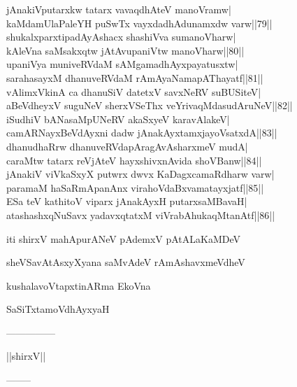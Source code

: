 \documentclass{article}
\begin{document}
jAnakiVputarxkw tatarx vavaqdhAteV manoVramw|\\
kaMdamUlaPaleYH puSwTx vayxdadhAdunamxdw varw||79||\\
shukalxparxtipadAyAshacx shashiVva sumanoVharw|\\
kAleVna saMsakxqtw jAtAvupaniVtw manoVharw||80||\\
upaniVya muniveRVdaM sAMgamadhAyxpayatusxtw|\\
sarahasayxM dhanuveRVdaM rAmAyaNamapAThayatf||81||\\
vAlimxVkinA ca dhanuSiV datetxV savxNeRV suBUSiteV|\\
aBeVdheyxV suguNeV sherxVSeThx veYrivaqMdasudAruNeV||82||\\
iSudhiV bANasaMpUNeRV akaSxyeV karavAlakeV|\\
camARNayxBeVdAyxni dadw jAnakAyxtamxjayoVsatxdA||83||\\
dhanudhaRrw dhanuveRVdapAragAvAsharxmeV mudA|\\
caraMtw tatarx reVjAteV hayxshivxnAvida shoVBanw||84||\\
jAnakiV viVkaSxyX putwrx dwvx KaDagxcamaRdharw varw|\\
paramaM haSaRmApanAnx virahoVdaBxvamatayxjatf||85||\\
ESa teV kathitoV viparx jAnakAyxH putarxsaMBavaH|\\
atashashxqNuSavx yadavxqtatxM viVrabAhukaqMtanAtf||86||\\

\begin{center}
iti shirxV mahApurANeV pAdemxV pAtALaKaMDeV
\end{center}

\begin{center}
sheVSavAtAsxyXyana saMvAdeV rAmAshavxmeVdheV
\end{center}

\begin{center}
kushalavoVtapxtinARma EkoVna
\end{center}

\begin{center}
SaSiTxtamoVdhAyxyaH
\end{center}

\begin{center}
---------------
\end{center}

\begin{center}
||shirxV||
\end{center}

\begin{center}
--------
\end{center}
\end{document}
